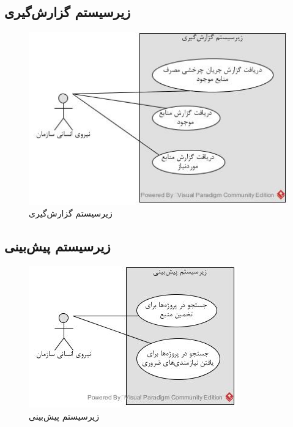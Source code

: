 \newpage
\subsection{زیرسیستم گزارش‌گیری}
\begin{figure}[H]
	\centering
	\includegraphics[scale=1]{img/usecase/report}
	\caption{زیرسیستم گزارش‌گیری}
\end{figure}

\newpage
\subsection{زیرسیستم پیش‌بینی}
\begin{figure}[H]
	\centering
	\includegraphics[scale=1]{img/usecase/est}
	\caption{زیرسیستم پیش‌بینی}
\end{figure}

\newpage

